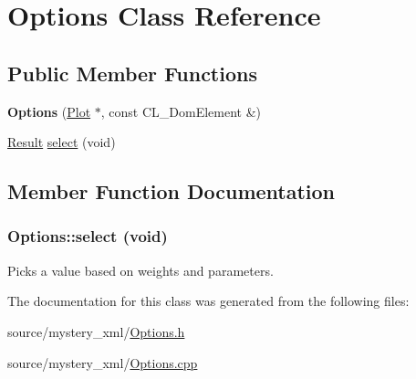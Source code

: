 \hypertarget{classOptions}{
\section{Options Class Reference}
\label{classOptions}
}
\subsection*{Public Member Functions}
\begin{DoxyCompactItemize}
\item 
\hypertarget{classOptions_a7724e0a467faf1a7538c7345400c0e3f}{
{\bfseries Options} (\hyperlink{classPlot}{Plot} $\ast$, const CL\_\-DomElement \&)}
\label{classOptions_a7724e0a467faf1a7538c7345400c0e3f}

\item 
\hyperlink{classResult}{Result} \hyperlink{classOptions_af944d166a9889b2ff225fe163ab92671}{select} (void)
\end{DoxyCompactItemize}


\subsection{Member Function Documentation}
\hypertarget{classOptions_af944d166a9889b2ff225fe163ab92671}{
\subsubsection[{select}]{ Options::select (void)}}
\label{classOptions_af944d166a9889b2ff225fe163ab92671}
Picks a value based on weights and parameters. 

The documentation for this class was generated from the following files:\begin{DoxyCompactItemize}
\item 
source/mystery\_\-xml/\hyperlink{Options_8h}{Options.h}\item 
source/mystery\_\-xml/\hyperlink{Options_8cpp}{Options.cpp}\end{DoxyCompactItemize}
